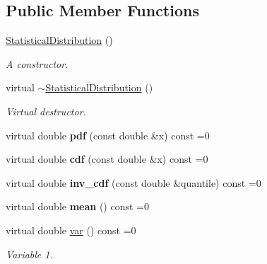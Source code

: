 \subsection*{Public Member Functions}
\begin{DoxyCompactItemize}
\item 
\hyperlink{classStatisticalDistribution_a0c968a41a854b3d33310b7bd78a7238a}{Statistical\+Distribution} ()
\begin{DoxyCompactList}\small\item\em A constructor. \end{DoxyCompactList}\item 
virtual \hyperlink{classStatisticalDistribution_a6bd83bc866a8156a3df846b98afe659a}{$\sim$\+Statistical\+Distribution} ()
\begin{DoxyCompactList}\small\item\em Virtual destructor. \end{DoxyCompactList}\item 
\mbox{\label{classStatisticalDistribution_aef1b717d8c6bc58c5b5806d1b935eb12}} 
virtual double {\bfseries pdf} (const double \&x) const =0
\item 
\mbox{\label{classStatisticalDistribution_aa7f52f4c8cadc971d9e189453ea0eb95}} 
virtual double {\bfseries cdf} (const double \&x) const =0
\item 
\mbox{\label{classStatisticalDistribution_aff50a79b73032b6f63db797124ec310f}} 
virtual double {\bfseries inv\+\_\+cdf} (const double \&quantile) const =0
\item 
\mbox{\label{classStatisticalDistribution_a68177d55b616f6c2f857ccf7afbf7789}} 
virtual double {\bfseries mean} () const =0
\item 
\mbox{\label{classStatisticalDistribution_ae66c6543b8d40d200b45d26f4fb3e3c2}} 
virtual double \hyperlink{classStatisticalDistribution_ae66c6543b8d40d200b45d26f4fb3e3c2}{var} () const =0
\begin{DoxyCompactList}\small\item\em Variable 1. \end{DoxyCompactList}\item 
\mbox{\label{classStatisticalDistribution_af097e57c0d28489af68ca8a4edaebcac}} 

\end{DoxyCompactItemize}
